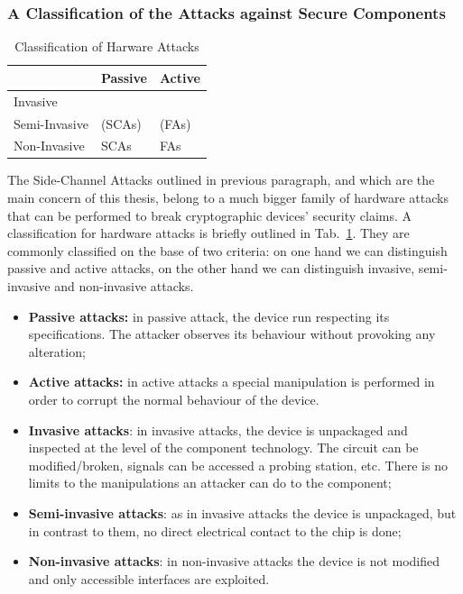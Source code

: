 \subsubsection{A Classification of the Attacks against Secure Components}\label{sec:classification_attacks}
\begin{table}[]
\centering
\caption{Classification of Harware Attacks}
\label{fig:classification_attacks}
\begin{tabular}{l|l|l|}
\cline{2-3}
                                    & Passive & Active \\ \hline
\multicolumn{1}{|l|}{Invasive}      &         &        \\ \hline
\multicolumn{1}{|l|}{Semi-Invasive} & (SCAs)  & (FAs)  \\ \hline
\multicolumn{1}{|l|}{Non-Invasive}  & SCAs    & FAs    \\ \hline
\end{tabular}
\end{table}

The Side-Channel Attacks outlined in previous paragraph, and which are the main concern of this thesis,  belong to a much bigger family of hardware attacks that can be performed to break cryptographic devices' security claims. A classification for hardware attacks is briefly outlined in Tab.~\ref{fig:classification_attacks}. They are commonly classified on the base of two criteria: on one hand we can distinguish passive and active attacks, on the other hand we can distinguish invasive, semi-invasive and non-invasive attacks. 
\begin{itemize}
\item[] \textbf{Passive attacks:} in passive attack, the device run respecting its specifications. The attacker observes its behaviour without provoking any alteration;
\item[] \textbf{Active attacks:}  in active attacks a special manipulation is performed in order to corrupt the normal behaviour of the device. 
\end{itemize}


\begin{itemize}
\item[] \textbf{Invasive attacks}: in invasive attacks, the device is unpackaged and inspected at the level of the component technology. The circuit can be modified/broken, signals can be accessed \via a probing station, etc. There is no limits to the manipulations an attacker can do to the component;
\item[] \textbf{Semi-invasive attacks}: as in invasive attacks the device is unpackaged, but in contrast to them, no direct electrical contact to the chip is done;
\item[] \textbf{Non-invasive attacks}: in non-invasive attacks the device is not modified and only accessible interfaces are exploited. 

\end{itemize}

